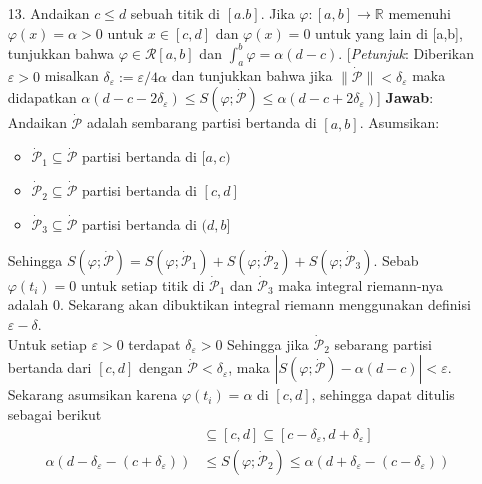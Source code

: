 \documentclass{article}
\begin{document}
\begin{enumerate}
        \item[13.]Andaikan $c\leq d$ sebuah titik di $[a.b]$. Jika $\varphi:[a,b]\to\mathbb{R}$ 
        memenuhi $\varphi(x)=\alpha>0$ untuk $x\in[c,d]$ dan $\varphi(x)=0$ untuk yang lain di [a,b],
        tunjukkan bahwa $\varphi\in\mathcal{R}[a,b]$ dan $\int_{a}^{b}\varphi=\alpha(d-c)$. 
        [\textit{Petunjuk}: Diberikan $\varepsilon>0$ misalkan $\delta_{\varepsilon}:=\varepsilon/4\alpha$ 
        dan tunjukkan bahwa jika $\|\dot{\mathcal{P}}\|<\delta_{\varepsilon}$ maka didapatkan 
        $\alpha(d-c-2\delta_{\varepsilon})\leq S(\varphi;\dot{\mathcal{P}})\leq \alpha(d-c+2\delta_{\varepsilon})$]
        \textbf{Jawab}:\\
        Andaikan $\dot{\mathcal{P}}$ adalah sembarang partisi bertanda di $[a,b]$. Asumsikan:
        \begin{itemize}
            \item $\dot{\mathcal{P}}_1\subseteq\dot{\mathcal{P}}$ partisi bertanda di $[a,c)$
            \item $\dot{\mathcal{P}}_2\subseteq\dot{\mathcal{P}}$ partisi bertanda di $[c,d]$
            \item $\dot{\mathcal{P}}_3\subseteq\dot{\mathcal{P}}$ partisi bertanda di $(d,b]$
        \end{itemize}
        Sehingga $S(\varphi;\dot{\mathcal{P}})=S(\varphi;\dot{\mathcal{P}}_1)+S(\varphi;\dot{\mathcal{P}}_2)+S(\varphi;\dot{\mathcal{P}}_3)$.
        Sebab $\varphi(t_i)=0$ untuk setiap titik di $\dot{\mathcal{P}}_1$ dan $\dot{\mathcal{P}}_3$
        maka integral riemann-nya adalah $0$. Sekarang akan dibuktikan integral riemann menggunakan definisi
        $\varepsilon-\delta$.\\
        Untuk setiap $\varepsilon>0$ terdapat $\delta_\varepsilon>0$ Sehingga jika $\dot{\mathcal{P}}_2$ sebarang
        partisi bertanda dari $[c,d]$ dengan $\dot{\mathcal{P}}<\delta_\varepsilon$, maka $|S(\varphi;\dot{\mathcal{P}})-\alpha(d-c)|< \varepsilon$.\\
        Sekarang asumsikan karena $\varphi(t_i)=\alpha$ di $[c,d]$, sehingga dapat ditulis sebagai berikut
        \begin{align*}
            [c+\delta_{\varepsilon},d-\delta_{\varepsilon}]&\subseteq[c,d]\subseteq[c-\delta_{\varepsilon},d+\delta_{\varepsilon}]\\
            \alpha(d-\delta_{\varepsilon}-(c+\delta_{\varepsilon}))&\leq S(\varphi;\dot{\mathcal{P}}_2)\leq \alpha(d+\delta_{\varepsilon}-(c-\delta_{\varepsilon}))\\

\end{align*}
\end{enumerate}
\end{document}
